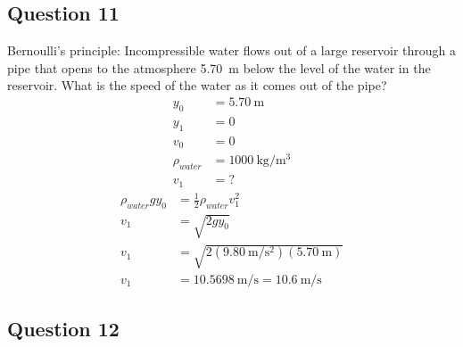 \documentclass{article}
\begin{document}
\subsection{Question 11}

Bernoulli's principle: Incompressible water flows out of a large reservoir through a pipe that opens to the atmosphere \SI{5.70}{\meter} below the level of the water in the reservoir. What is the speed of the water as it comes out of the pipe?
\begin{align*}
	y_0 & = \SI{5.70}{\meter} \\
	y_1 & = 0 \\
	v_0 & = 0 \\
	\rho_{water} & = \SI{1000}{\kilogram \per \meter \cubed} \\
	v_1 & = ?
\end{align*}
\begin{align*}
	\rho_{water}gy_0 & = \frac{1}{2}\rho_{water}v_1^2 \\
	v_1 & = \sqrt{ 2gy_0 } \\
	v_1 & = \sqrt{ 2(\SI{9.80}{\meter \per \second \squared})(\SI{5.70}{\meter}) } \\
	v_1 & = \SI{10.5698}{\meter \per \second} = \SI{10.6}{\meter \per \second}
\end{align*}

\subsection{Question 12}
\end{document}
